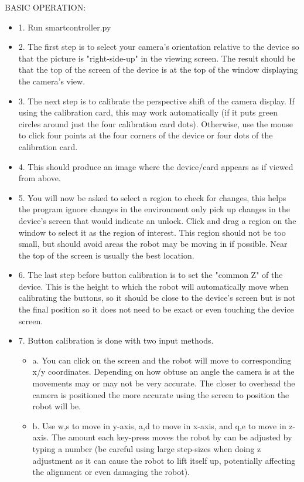 \documentclass[a4paper,12pt]{letter}
\begin{document}
BASIC OPERATION:
\begin{itemize}
\item 1. Run smartcontroller.py
\item 2. The first step is to select your camera's orientation relative to the device so that the picture is "right-side-up" in the viewing screen. The result should be that the top of the screen of the device is at the top of the window displaying the camera's view.
\item 3. The next step is to calibrate the perspective shift of the camera display. If using the calibration card, this may work automatically (if it puts green circles around just the four calibration card dots). Otherwise, use the mouse to click four points at the four corners of the device or four dots of the calibration card.
\item 4. This should produce an image where the device/card appears as if viewed from above.
\item 5. You will now be asked to select a region to check for changes, this helps the program ignore changes in the environment only pick up changes in the device's screen that would indicate an unlock. Click and drag a region on the window to select it as the region of interest. This region should not be too small, but should avoid areas the robot may be moving in if possible. Near the top of the screen is usually the best location.
\item 6. The last step before button calibration is to set the "common Z" of the device. This is the height to which the robot will automatically move when calibrating the buttons, so it should be close to the device's screen but is not the final position so it does not need to be exact or even touching the device screen.
\item 7. Button calibration is done with two input methods. 
\begin{itemize}
\item a. You can click on the screen and the robot will move to corresponding x/y coordinates. Depending on how obtuse an angle the camera is at the movements may or may not be very accurate. The closer to overhead the camera is positioned the more accurate using the screen to position the robot will be. 
\item  b. Use w,s to move in y-axis, a,d to move in x-axis, and q,e to move in z-axis. The amount each key-press moves the robot by can be adjusted by typing a number (be careful using large step-sizes when doing z adjustment as it can cause the robot to lift itself up, potentially affecting the alignment or even damaging the robot).

\end{itemize}
\end{itemize}
\end{document}
